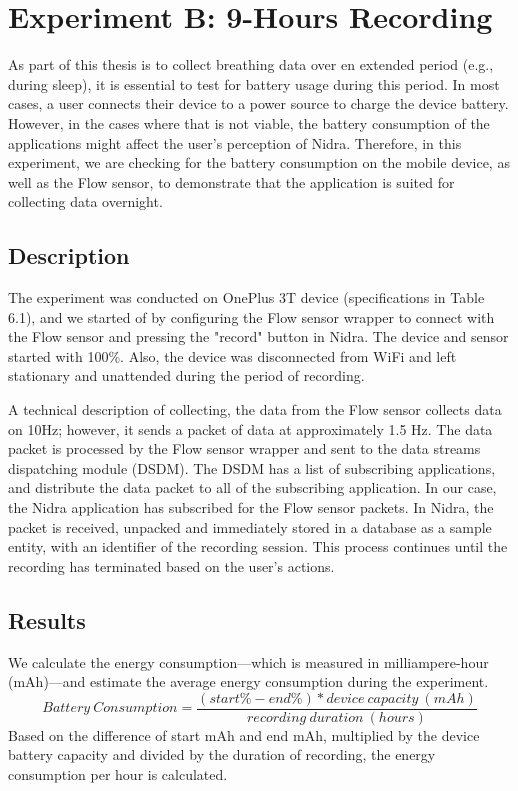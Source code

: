 \section{Experiment B: 9-Hours Recording}
As part of this thesis is to collect breathing data over en extended period (e.g., during sleep), it is essential to test for battery usage during this period. In most cases, a user connects their device to a power source to charge the device battery. However, in the cases where that is not viable, the battery consumption of the applications might affect the user's perception of Nidra. Therefore, in this experiment, we are checking for the battery consumption on the mobile device, as well as the Flow sensor, to demonstrate that the application is suited for collecting data overnight.

\subsection{Description}
The experiment was conducted on OnePlus 3T device (specifications in Table 6.1), and we started of by configuring the Flow sensor wrapper to connect with the Flow sensor and pressing the "record" button in Nidra. The device and sensor started with 100\%. Also, the device was disconnected from WiFi and left stationary and unattended during the period of recording.  

A technical description of collecting, the data from the Flow sensor collects data on 10Hz; however, it sends a packet of data at approximately 1.5 Hz. The data packet is processed by the Flow sensor wrapper and sent to the data streams dispatching module (DSDM). The DSDM has a list of subscribing applications, and distribute the data packet to all of the subscribing application. In our case, the Nidra application has subscribed for the Flow sensor packets. In Nidra, the packet is received, unpacked and immediately stored in a database as a sample entity, with an identifier of the recording session. This process continues until the recording has terminated based on the user's actions.

\subsection{Results}

We calculate the energy consumption---which is measured in milliampere-hour (mAh)---and estimate the average energy consumption during the experiment. 
\begin{equation} \label{losscount}
Battery\ Consumption = \frac{(start\% - end\%) * device\ capacity\ (mAh)}{recording\ duration\ (hours)}
\end{equation}
Based on the difference of start mAh and end mAh, multiplied by the device battery capacity and divided by the duration of recording, the energy consumption per hour is calculated. 


